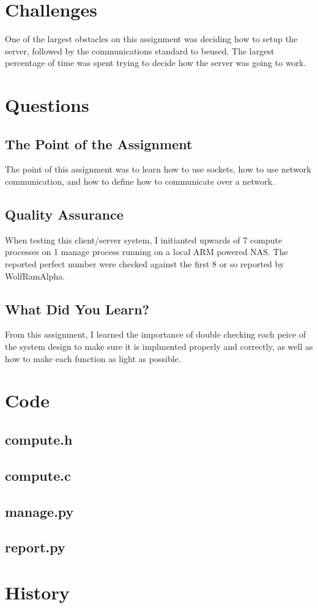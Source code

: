 \documentclass[letterpaper,10pt,titlepage]{article}
\begin{document}
\section{Challenges}
\label{Overcoming Project challenges}
One of the largest obstacles on this assignment was deciding how to setup the server, followed by the communications standard to beused. The largest percentage of time was spent trying to decide how the server was going to work.

\section{Questions}
\label{Project Quesions}
\subsection{The Point of the Assignment}
\label{Point}
The point of this assignment was to learn how to use sockets, how to use network communication, and how to define how to communicate over a network.
\subsection{Quality Assurance}
\label{QA}
When testing this client/server system, I initianted upwards of 7 compute processes on 1 manage process running on a local ARM powered NAS. The reported perfect number were checked against the first 8 or so reported by WolfRamAlpha.
\subsection{What Did You Learn?}
\label{Learned}
From this assignment, I learned the importance of double checking each peice of the system design to make sure it is implmented properly and correctly, as well as how to make each function as light as possible.


\section{Code}
\label{myar Source Code}

\subsection{compute.h}
\label{Compute Header}


\subsection{compute.c}
\label{Compute}


\subsection{manage.py}
\label{Manage Server}


\subsection{report.py}
\label{Report Clinet}


\section{History}
\end{document}
